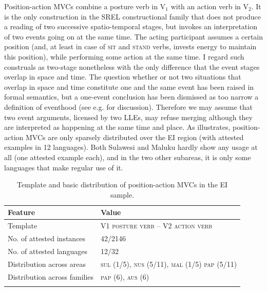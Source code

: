 \largerpage[-2]
Position-action MVCs combine a posture verb in V$_1$ with an action verb in V$_2$. It is the only construction in the SREL constructional family that does not produce a reading of two successive spatio-temporal stages, but invokes an interpretation of two events going on at the same time. The acting participant assumes a certain position (and, at least in case of \textsc{sit} and \textsc{stand} verbs, invests energy to maintain this position), while performing some action at the same time. I regard such construals as two-stage nonetheless with the only difference that the event stages overlap in space and time. The question whether or not two situations that overlap in space and time constitute one and the same event has been raised in formal semantics, but a one-event conclusion has been dismissed as too narrow a definition of eventhood (see e.g. \citealt{maienborn2005limits} for discussion). Therefore we may assume that two event arguments, licensed by two LLEs, may refuse merging although they are interpreted as happening at the same time and place. As  illustrates, position-action MVCs are only sparsely distributed over the EI region (with attested examples in 12 languages). Both Sulawesi and Maluku hardly show any usage at all (one attested example each), and in the two other subareas, it is only some languages that make regular use of it.

\begin{table}[t]
\begin{tabular}{ll}
\lsptoprule
Feature&Value\tabularnewline
\midrule
Template&V1 \textsc{posture verb} -- V2 \textsc{action verb}\tabularnewline
No. of attested instances& 42/2146 \tabularnewline
No. of attested languages& 12/32 \tabularnewline
Distribution across areas& \textsc{sul} (1/5), \textsc{nus} (5/11), \textsc{mal} (1/5) \textsc{pap} (5/11) \tabularnewline
Distribution across families& \textsc{pap} (6), \textsc{aus} (6) \tabularnewline
\lspbottomrule
\end{tabular}
\caption[Template and basic distribution of position-action MVCs]{Template and basic distribution of position-action MVCs in the EI sample.}
\label{table:position-action}
\end{table}

